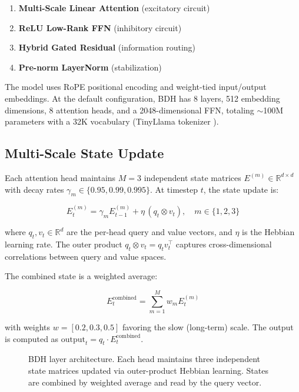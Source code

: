 \documentclass{article}
\begin{document}
\begin{enumerate}
    \item \textbf{Multi-Scale Linear Attention} (excitatory circuit)
    \item \textbf{ReLU Low-Rank FFN} (inhibitory circuit)
    \item \textbf{Hybrid Gated Residual} (information routing)
    \item \textbf{Pre-norm LayerNorm} (stabilization)
\end{enumerate}

The model uses RoPE positional encoding \citep{su2024roformer} and weight-tied input/output embeddings. At the default configuration, BDH has 8 layers, 512 embedding dimensions, 8 attention heads, and a 2048-dimensional FFN, totaling $\sim$100M parameters with a 32K vocabulary (TinyLlama tokenizer \citep{touvron2023llama}).

\subsection{Multi-Scale State Update}

Each attention head maintains $M=3$ independent state matrices $E^{(m)} \in \mathbb{R}^{d \times d}$ with decay rates $\gamma_m \in \{0.95, 0.99, 0.995\}$. At timestep $t$, the state update is:

\begin{equation}
E^{(m)}_t = \gamma_m E^{(m)}_{t-1} + \eta \, (q_t \otimes v_t), \quad m \in \{1,2,3\}
\end{equation}

where $q_t, v_t \in \mathbb{R}^d$ are the per-head query and value vectors, and $\eta$ is the Hebbian learning rate. The outer product $q_t \otimes v_t = q_t v_t^\top$ captures cross-dimensional correlations between query and value spaces.

The combined state is a weighted average:

\begin{equation}
E^{\text{combined}}_t = \sum_{m=1}^{M} w_m E^{(m)}_t
\end{equation}

with weights $w = [0.2, 0.3, 0.5]$ favoring the slow (long-term) scale. The output is computed as $\text{output}_t = q_t \cdot E^{\text{combined}}_t$.

\begin{figure}[t]
    \centering
    \caption{BDH layer architecture. Each head maintains three independent state matrices updated via outer-product Hebbian learning. States are combined by weighted average and read by the query vector.}
    \label{fig:architecture}
\end{figure}
\end{document}
